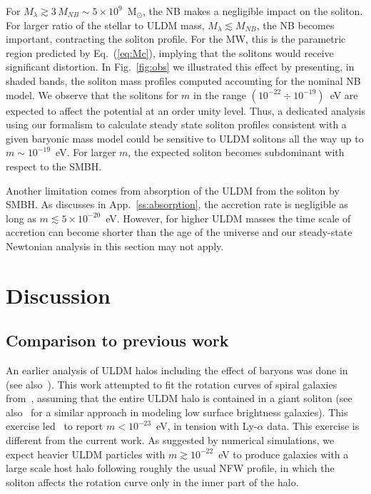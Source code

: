 \documentclass[aps,prd,floats,superscriptaddress,showpacs,nofootinbib,twocolumn,preprintnumbers]{revtex4-1}%
\begin{document}
For $M_\lambda\gtrsim3\,M_{NB}\sim5\times10^9$~M$_\odot$, the NB makes
a negligible impact on the soliton. 
% 
%
For larger ratio of the stellar to ULDM mass, $M_\lambda\lesssim
M_{NB}$, the NB becomes important, contracting the soliton
profile. For the MW, this is the parametric region predicted by
Eq.~(\ref{eq:Mc}), implying that the solitons would receive
significant distortion. In Fig.~\ref{fig:obs} we illustrated this
effect by presenting, in shaded bands, the soliton mass profiles
computed accounting for the nominal NB model. 
We observe that the solitons for $m$ in the range
$(10^{-22}\div 10^{-19})$~eV 
are expected
to affect the potential at an order unity level.
Thus, a dedicated analysis using our formalism to calculate
steady state soliton profiles 
consistent with a given baryonic mass model could be sensitive to ULDM
solitons all the way up to $m\sim 10^{-19}$~eV.
For larger $m$, the expected soliton becomes
subdominant with respect to the SMBH. 

Another limitation comes from
absorption of the ULDM from the soliton by SMBH.
As discusses in App.~\ref{ss:absorption}, the accretion rate is
negligible as long as $m\lesssim 5\times 10^{-20}$~eV. However, for
higher ULDM masses the time scale of accretion can become shorter than the
age of the universe and our steady-state Newtonian analysis in
this section may not apply.


\section{Discussion}\label{sec:discussion}

\subsection{Comparison to previous work}\label{ss:prev}
%
An earlier analysis of ULDM halos including the effect of baryons was
done in~\cite{Arbey:2001qi} (see also~\cite{Lesgourgues:2002hk}). This
work attempted to fit the rotation curves of spiral galaxies
from~\cite{Persic:1995ru}, assuming that the entire ULDM halo is
contained in a giant soliton (see
also~\cite{Fernandez-Hernandez:2017rds} for a similar approach in
modeling low surface brightness galaxies). This exercise
led~\cite{Arbey:2001qi} to report $m<10^{-23}$~eV, in tension with
Ly-$\alpha$ data. This exercise is different from the current work. As suggested by numerical simulations, we
expect heavier ULDM particles with $m\gtrsim10^{-22}$~eV to produce
galaxies with a large scale host halo following roughly the usual NFW
profile, in which the soliton affects the rotation curve only in the
inner part of the halo. 
%
\end{document}
